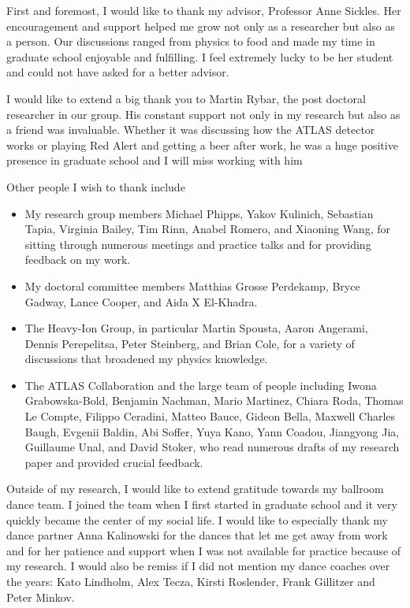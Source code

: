 
First and foremost, I would like to thank my advisor, Professor Anne Sickles.
Her encouragement and support helped me grow not only as a researcher but also as a person.
Our discussions ranged from physics to food and made my time in graduate school enjoyable and fulfilling. 
I feel extremely lucky to be her student and could not have asked for a better advisor.

I would like to extend a big thank you to Martin Rybar, the post doctoral researcher in our group.
His constant support not only in my research but also as a friend was invaluable.
Whether it was discussing how the ATLAS detector works or playing Red Alert and getting a beer after work, he was a huge positive presence in graduate school and I will miss working with him

Other people I wish to thank include
\begin{itemize}

\item My research group members Michael Phipps, Yakov Kulinich, Sebastian Tapia, Virginia Bailey, Tim Rinn, Anabel Romero, and Xiaoning Wang, for sitting through numerous meetings and practice talks and for providing feedback on my work.

\item My doctoral committee members Matthias Grosse Perdekamp, Bryce Gadway, Lance Cooper, and Aida X El-Khadra.

\item The Heavy-Ion Group, in particular Martin Spousta, Aaron Angerami, Dennis Perepelitsa, Peter Steinberg, and Brian Cole, for a variety of discussions that broadened my physics knowledge.

\item The ATLAS Collaboration and the large team of people including Iwona Grabowska-Bold, Benjamin Nachman, Mario Martinez, Chiara Roda, Thomas Le Compte, Filippo Ceradini, Matteo Bauce, Gideon Bella, Maxwell Charles Baugh, Evgenii Baldin, Abi Soffer, Yuya Kano, Yann Coadou, Jiangyong Jia, Guillaume Unal, and David Stoker, who read numerous drafts of my research paper and provided crucial feedback.

\end{itemize}

Outside of my research, I would like to extend gratitude towards my ballroom dance team.
I joined the team when I first started in graduate school and it very quickly became the center of my social life.
I would like to especially thank my dance partner Anna Kalinowski for the dances that let me get away from work and for her patience and support when I was not available for practice because of my research.
I would also be remiss if I did not mention my dance coaches over the years: Kato Lindholm, Alex Tecza, Kirsti Roslender, Frank Gillitzer and Peter Minkov.

